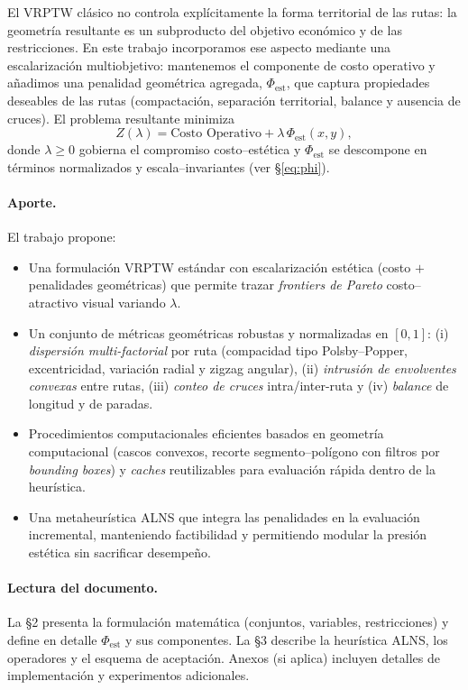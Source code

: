 \documentclass[11pt, a4paper]{article}
\begin{document}
El VRPTW clásico no controla explícitamente la forma territorial de las rutas: la geometría resultante es un subproducto del objetivo económico y de las restricciones. En este trabajo incorporamos ese aspecto mediante una escalarización multiobjetivo: mantenemos el componente de costo operativo y añadimos una penalidad geométrica agregada, $\Phi_{\text{est}}$, que captura propiedades deseables de las rutas (compactación, separación territorial, balance y ausencia de cruces). El problema resultante minimiza
\[
Z(\lambda)=\text{Costo Operativo}+\lambda\,\Phi_{\text{est}}(x,y),
\]
donde $\lambda\ge 0$ gobierna el compromiso costo–estética y $\Phi_{\text{est}}$ se descompone en términos normalizados y escala–invariantes (ver \S\ref{eq:phi}).

\paragraph{Aporte.} El trabajo propone:
\begin{itemize}[leftmargin=1.4em]
    \item Una formulación VRPTW estándar con escalarización estética (costo $+$ penalidades geométricas) que permite trazar \emph{frontiers de Pareto} costo–atractivo visual variando $\lambda$.
    \item Un conjunto de métricas geométricas robustas y normalizadas en $[0,1]$: (i) \emph{dispersión multi-factorial} por ruta (compacidad tipo Polsby–Popper, excentricidad, variación radial y zigzag angular), (ii) \emph{intrusión de envolventes convexas} entre rutas, (iii) \emph{conteo de cruces} intra/inter-ruta y (iv) \emph{balance} de longitud y de paradas.
    \item Procedimientos computacionales eficientes basados en geometría computacional (cascos convexos, recorte segmento–polígono con filtros por \emph{bounding boxes}) y \emph{caches} reutilizables para evaluación rápida dentro de la heurística.
    \item Una metaheurística ALNS que integra las penalidades en la evaluación incremental, manteniendo factibilidad y permitiendo modular la presión estética sin sacrificar desempeño.
\end{itemize}

\paragraph{Lectura del documento.} La \S2 presenta la formulación matemática (conjuntos, variables, restricciones) y define en detalle $\Phi_{\text{est}}$ y sus componentes. La \S3 describe la heurística ALNS, los operadores y el esquema de aceptación. Anexos (si aplica) incluyen detalles de implementación y experimentos adicionales.
\end{document}
